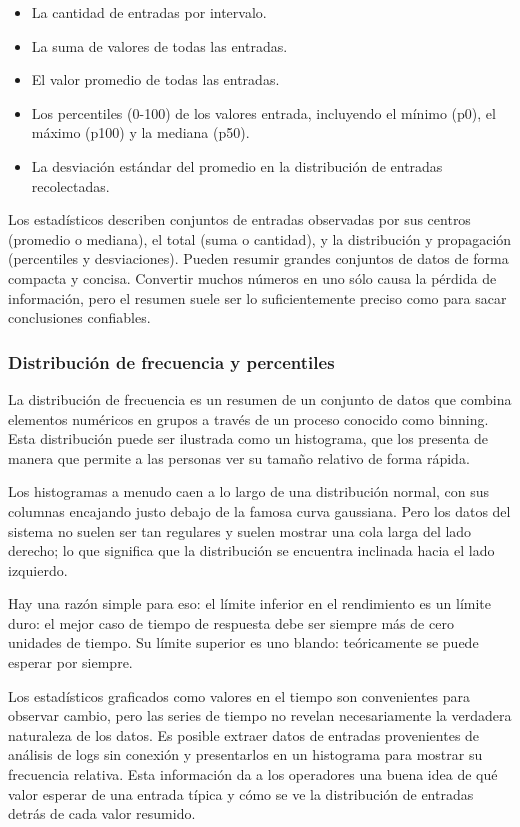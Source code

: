 \begin{itemize}
  \item La cantidad de entradas por intervalo.
  \item La suma de valores de todas las entradas.
  \item El valor promedio de todas las entradas.
  \item Los percentiles (0-100) de los valores entrada, incluyendo el mínimo
    (p0), el máximo (p100) y la mediana (p50).
  \item La desviación estándar del promedio en la distribución de entradas
    recolectadas.
\end{itemize}

Los estadísticos describen conjuntos de entradas observadas por sus centros
(promedio o mediana), el total (suma o cantidad), y la distribución y
propagación (percentiles y desviaciones). Pueden resumir grandes conjuntos de
datos de forma compacta y concisa. Convertir muchos números en uno sólo causa
la pérdida de información, pero el resumen suele ser lo suficientemente preciso
como para sacar conclusiones confiables.

\subsubsection*{Distribución de frecuencia y percentiles}
\label{distribucion_de_frecuencia_y_percentiles}

La distribución de frecuencia es un resumen de un conjunto de datos que combina
elementos numéricos en grupos a través de un proceso conocido como binning.
Esta distribución puede ser ilustrada como un histograma, que los presenta
de manera que permite a las personas ver su tamaño relativo de forma rápida.

Los histogramas a menudo caen a lo largo de una distribución normal, con sus
columnas encajando justo debajo de la famosa curva gaussiana. Pero los datos
del sistema no suelen ser tan regulares y suelen mostrar una cola larga del
lado derecho; lo que significa que la distribución se encuentra inclinada hacia
el lado izquierdo.

Hay una razón simple para eso: el límite inferior en el rendimiento es un
límite duro: el mejor caso de tiempo de respuesta debe ser siempre más de cero
unidades de tiempo. Su límite superior es uno blando: teóricamente se puede
esperar por siempre.

Los estadísticos graficados como valores en el tiempo son convenientes para
observar cambio, pero las series de tiempo no revelan necesariamente la
verdadera naturaleza de los datos. Es posible extraer datos de entradas
provenientes de análisis de logs sin conexión y presentarlos en un histograma
para mostrar su frecuencia relativa. Esta información da a los operadores una
buena idea de qué valor esperar de una entrada típica y cómo se ve la
distribución de entradas detrás de cada valor resumido.

